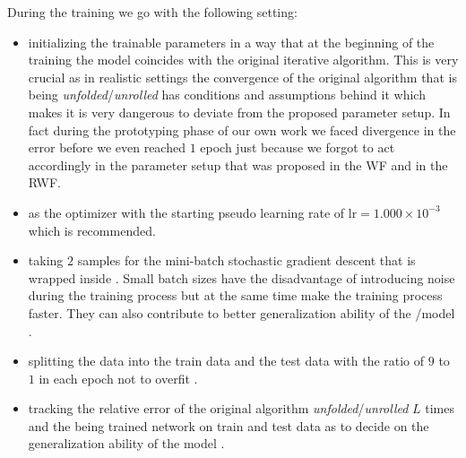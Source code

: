 During the training we go with the following setting:
\begin{itemize}
  \item initializing the trainable parameters in a way that at the beginning of the training the model coincides with the original iterative algorithm. 
  This is very crucial as in realistic settings the convergence of the original algorithm that is being \emph{unfolded}/\emph{unrolled} has conditions and 
  assumptions behind it which makes it is very dangerous to deviate from the proposed parameter setup. In fact during the prototyping phase of our own work 
  we faced divergence in the error before we even reached $1$ epoch 
  just because we forgot to act accordingly in the parameter setup that was proposed in the \ac{WF} and in the \ac{RWF}.    
  \item \adam\cite{Kingma2014}\index{\adam} as the optimizer with the starting 
  pseudo learning rate of $\mathrm{lr}=1.000\times10^{-3}$ which is 
  recommended\cite{Kingma2014}\cite{Sun2019}.
  \item taking $2$\cite{Masters2018} samples for the mini-batch stochastic gradient descent 
  that is wrapped inside \adam\cite{Kingma2014}\index{\adam}. Small batch sizes have the 
  disadvantage of introducing noise during the training process but at the same time make 
  the training process faster. They can also contribute to better generalization ability 
  of the \ml/\dl model \cite{Masters2018}.
  \item splitting the data into the train data and the test data with the ratio of $9$ to $1$ 
  in each epoch  not to overfit \cite{Goodfellow2016}\cite{Chollet2023}.
  \item tracking the relative error of the original algorithm \emph{unfolded}/\emph{unrolled} $L$ times 
  and the being trained network on train and test data as to decide on the generalization ability of the model \cite{Goodfellow2016}\cite{Chollet2023}.
\end{itemize}

